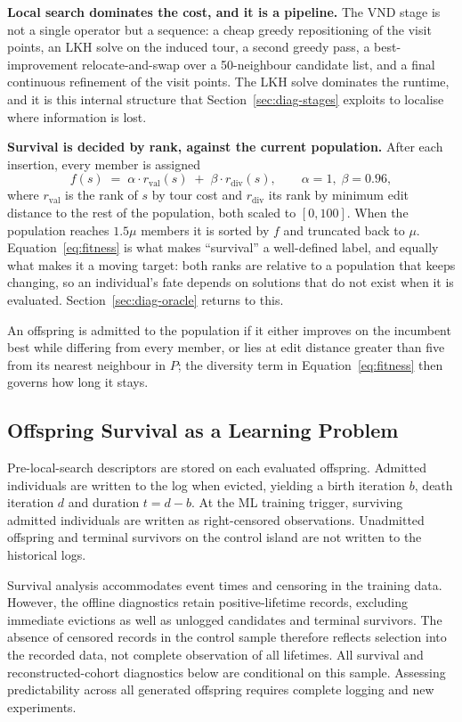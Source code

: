 \documentclass[a4paper,fleqn]{cas-dc}
\begin{document}
\textbf{Local search dominates the cost, and it is a pipeline.} The VND stage is
not a single operator but a sequence: a cheap greedy repositioning of the visit
points, an LKH solve on the induced tour, a second greedy pass, a
best-improvement relocate-and-swap over a 50-neighbour candidate list, and a
final continuous refinement of the visit points. The LKH solve dominates the
runtime, and it is this internal structure that Section~\ref{sec:diag-stages}
exploits to localise where information is lost.

\textbf{Survival is decided by rank, against the current population.} After each
insertion, every member is assigned
\begin{equation}
f(s) \;=\; \alpha \cdot r_{\text{val}}(s) \;+\; \beta \cdot r_{\text{div}}(s),
\qquad \alpha = 1,\; \beta = 0.96,
\label{eq:fitness}
\end{equation}
where $r_{\text{val}}$ is the rank of $s$ by tour cost and $r_{\text{div}}$ its
rank by minimum edit distance to the rest of the population, both scaled to
$[0, 100]$. When the population reaches $1.5\mu$ members it is sorted by $f$ and
truncated back to $\mu$. Equation~\eqref{eq:fitness} is what makes ``survival''
a well-defined label, and equally what makes it a moving target: both ranks are
relative to a population that keeps changing, so an individual's fate depends on
solutions that do not exist when it is evaluated. Section~\ref{sec:diag-oracle}
returns to this.

An offspring is admitted to the population if it either improves on the
incumbent best while differing from every member, or lies at edit distance
greater than five from its nearest neighbour in $P$; the diversity term in
Equation~\eqref{eq:fitness} then governs how long it stays.

\subsection{Offspring Survival as a Learning Problem}\label{sec:fw-survival}

Pre-local-search descriptors are stored on each evaluated offspring. Admitted
individuals are written to the log when evicted, yielding a birth iteration $b$,
death iteration $d$ and duration $t=d-b$. At the ML training trigger, surviving
admitted individuals are written as right-censored observations. Unadmitted
offspring and terminal survivors on the control island are not written to the
historical logs.

Survival analysis accommodates event times and censoring in the training data.
However, the offline diagnostics retain positive-lifetime records, excluding
immediate evictions as well as unlogged candidates and terminal survivors. The
absence of censored records in the control sample therefore reflects selection
into the recorded data, not complete observation of all lifetimes. All survival
and reconstructed-cohort diagnostics below are conditional on this sample.
Assessing predictability across all generated offspring requires complete
logging and new experiments.
\end{document}
